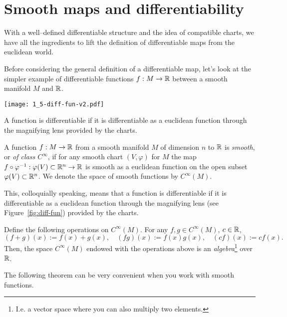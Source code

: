 \section{Smooth maps and differentiability}\label{sec:smoothfn}

With a well--defined differentiable structure and the idea of compatible charts, we have all the ingredients to lift the definition of differentiable maps from the euclidean world.

Before considering the general definition of a differentiable map, let's look at the simpler example of differentiable functions $f:M\to\mathbb{R}$ between a smooth manifold $M$ and $\mathbb{R}$.

\begin{marginfigure}
	\texttt{[image: 1\_5-diff-fun-v2.pdf]}
	\label{fig:diff-fun}
	\caption{A function is differentiable if it is differentiable as a euclidean function through the magnifying lens provided by the charts.}
\end{marginfigure}
\begin{definition}
	A function $f:M\to\mathbb{R}$ from a smooth manifold $M$ of dimension $n$ to $\mathbb{R}$ is \emph{smooth}, or \emph{of class $C^\infty$}, if for any smooth chart $(V, \varphi)$ for $M$ the map $f\circ\varphi^{-1}:\varphi(V)\subset\mathbb{R}^n \to \mathbb{R}$ is smooth as a euclidean function on the open subset $\varphi(V)\subset\mathbb{R}^n$.
	We denote the space of smooth functions by $C^\infty(M)$.
\end{definition}

This, colloquially speaking, means that a function is differentiable if it is differentiable as a euclidean function through the magnifying lens (see Figure~\ref{fig:diff-fun}) provided by the charts.

\begin{exercise}
	Define the following operations on $C^\infty(M)$.
	For any $f,g\in C^\infty(M)$, $c\in\mathbb{R}$,
	\begin{equation}
		(f+g)(x) := f(x) + g(x),\quad
		(fg)(x) := f(x) g(x),\quad
		(cf)(x) := c f(x).
	\end{equation}
	Then, the space $C^\infty(M)$ endowed with the operations above is an \emph{algebra}\footnote{I.e. a vector space where you can also multiply two elements.} over $\mathbb{R}$.
\end{exercise}

The following theorem can be very convenient when you work with smooth functions.

